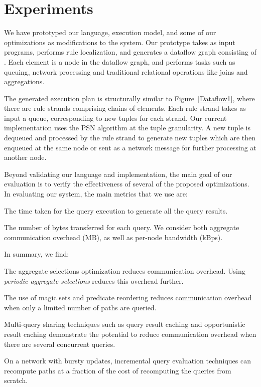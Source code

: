 

\section{Experiments}
\label{sec:expr}
We have prototyped our language, execution model, and some of our
optimizations as modifications to the \Pitu system. Our
prototype takes as input \Dlog programs, performs rule localization, and generates a dataflow graph
consisting of \Pitu \xspace{\em elements}. Each element is a node in the dataflow
graph, and performs tasks such as queuing, network processing and
traditional relational operations like joins and aggregations.

The generated execution plan is structurally similar to
Figure~\ref{Dataflow1}, where there are rule strands comprising
chains of elements. Each rule strand takes as input a queue,
corresponding to new tuples for each strand. Our current
implementation uses the PSN algorithm at the tuple granularity. A
new tuple is dequeued and processed by the rule strand to generate new
tuples which are then enqueued at the same node or sent as a network
message for further processing at another node.

Beyond validating our language and implementation, the main goal of our evaluation
is to verify the effectiveness of several of the proposed
optimizations. In evaluating our system, the main metrics that we use
are: 

\vspace{1pt}
The time taken for the query execution
to generate all the query results.

\vspace{1pt}
The number of bytes transferred
  for each query. We consider both aggregate communication overhead (MB), as well as
  per-node bandwidth (kBps).


In summary, we find:
  
\begin{CompactEnumerate}
\item The aggregate selections optimization reduces communication overhead. Using {\em
  periodic aggregate selections} reduces this overhead further. 

\item The use of magic sets and predicate reordering reduces communication overhead when only a limited number of paths
  are queried. 

\item Multi-query sharing techniques such as query result caching and
  opportunistic result caching demonstrate the potential to reduce communication
  overhead when there are several concurrent queries.

\item On a network with bursty updates, incremental query evaluation
  techniques can recompute paths at a fraction of the cost of
  recomputing the queries from scratch.
  
\end{CompactEnumerate}

